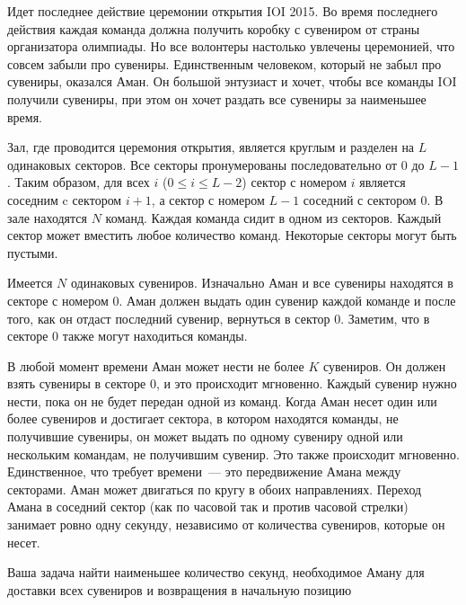Идет последнее действие церемонии открытия IOI 2015. Во время последнего действия
каждая команда должна получить коробку с сувениром от страны организатора олимпиады.
Но все волонтеры настолько увлечены церемонией, что совсем забыли про сувениры.
Единственным человеком, который не забыл про сувениры, оказался Аман. Он большой
энтузиаст и хочет, чтобы все команды IOI получили сувениры, при этом он хочет раздать все
сувениры за наименьшее время.


Зал, где проводится церемония открытия, является круглым и разделен на $L$ одинаковых
секторов. Все секторы пронумерованы последовательно от $0$ до $L - 1$. Таким образом, для
всех $i$ ($0 \le i \le L - 2$) сектор с номером $i$ является соседним c сектором $i + 1$, а сектор с
номером $L - 1$ соседний с сектором $0$. В зале находятся $N$ команд. Каждая команда сидит в
одном из секторов. Каждый сектор может вместить любое количество команд. Некоторые
секторы могут быть пустыми.


Имеется $N$ одинаковых сувениров. Изначально Аман и все сувениры находятся в секторе с
номером $0$. Аман должен выдать один сувенир каждой команде и после того, как он отдаст
последний сувенир, вернуться в сектор $0$. Заметим, что в секторе $0$ также могут находиться
команды.


В любой момент времени Аман может нести не более $K$ сувениров. Он должен взять
сувениры в секторе $0$, и это происходит мгновенно. Каждый сувенир нужно нести, пока он не
будет передан одной из команд. Когда Аман несет один или более сувениров и достигает
сектора, в котором находятся команды, не получившие сувениры, он может выдать по одному
сувениру одной или нескольким командам, не получившим сувенир. Это также происходит
мгновенно. Единственное, что требует времени~--- это передвижение Амана между секторами.
Аман может двигаться по кругу в обоих направлениях. Переход Амана в соседний сектор (как
по часовой так и против часовой стрелки) занимает ровно одну секунду, независимо от
количества сувениров, которые он несет.

Ваша задача найти наименьшее количество секунд, необходимое Аману для доставки всех
сувениров и возвращения в начальную позицию

